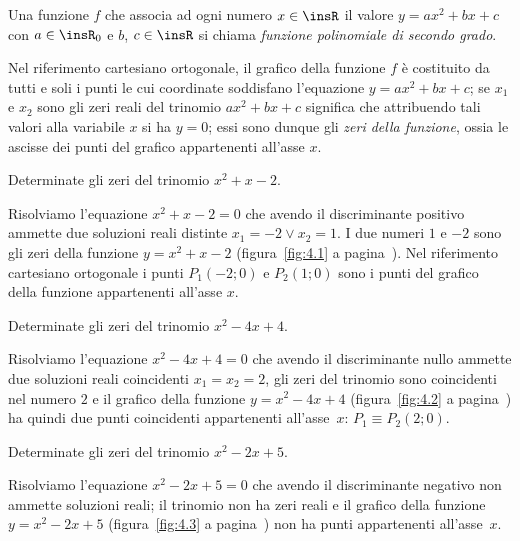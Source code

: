 \begin{definizione}
Una funzione $f$ che associa ad ogni numero $x\in \insR$ il valore $y=ax^2+bx+c$ con $a\in \insR_{0}$ e $b$, $c\in \insR$ si chiama \emph{funzione polinomiale di secondo grado}.
\end{definizione}

Nel riferimento cartesiano ortogonale, il grafico della funzione $f$ è costituito da tutti e soli i punti le cui coordinate soddisfano l'equazione $y=ax^2+bx+c$; se $x_1$ e $x_2$ sono gli zeri reali del trinomio $ax^2+bx+c$ significa che attribuendo tali valori alla variabile $x$ si ha $y=0$; essi sono dunque gli \emph{zeri della funzione}, ossia le ascisse dei punti del grafico appartenenti all'asse $x$.
\pagebreak
\begin{exrig}
\begin{esempio}
\label{ex:4.9}
Determinate gli zeri del trinomio $x^2+x-2$.

Risolviamo l'equazione $x^2+x-2=0$ che avendo il discriminante positivo ammette due soluzioni reali distinte $x_1=-2\vee x_2=1$. I due numeri $1$ e $-2$ sono gli zeri della funzione $y=x^2+x-2$ (figura~\ref{fig:4.1} a pagina~\pageref{fig:4.1}). Nel riferimento cartesiano ortogonale i punti $P_1(-2;0)$ e $P_2(1;0)$ sono i punti del grafico della funzione appartenenti all'asse $x$.
\end{esempio}

\begin{esempio}
\label{ex:4.10}
Determinate gli zeri del trinomio $x^2-4x+4$.

Risolviamo l'equazione $x^2-4x+4=0$ che avendo il discriminante nullo ammette due soluzioni reali coincidenti $x_1=x_2=2$, gli zeri del trinomio sono coincidenti nel numero $2$ e il grafico della funzione $y=x^2-4x+4$  (figura~\ref{fig:4.2} a pagina~\pageref{fig:4.2}) ha quindi due punti coincidenti appartenenti all'asse~$x$: $P_1\equiv P_2(2;0)$.
\end{esempio}

\begin{esempio}
\label{ex:4.11}
Determinate gli zeri del trinomio $x^2-2x+5$.

Risolviamo l'equazione $x^2-2x+5=0$ che avendo il discriminante negativo non ammette soluzioni reali; il trinomio non ha zeri reali e il grafico della funzione $y=x^2-2x+5$ (figura~\ref{fig:4.3} a pagina~\pageref{fig:4.3}) non ha punti appartenenti all'asse~$x$.
\end{esempio}
\end{exrig}

